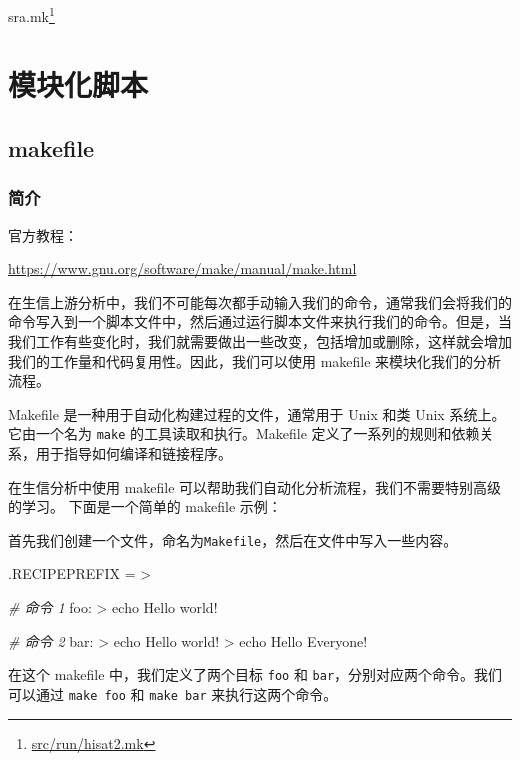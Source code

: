 \documentclass[]{ctexbook}
\newenvironment{Shaded}{\begin{snugshade}}{\end{snugshade}}
\newcommand{\CharTok}[1]{\textcolor[rgb]{0.31,0.60,0.02}{#1}}
\newcommand{\CommentTok}[1]{\textcolor[rgb]{0.56,0.35,0.01}{\textit{#1}}}
\newcommand{\DataTypeTok}[1]{\textcolor[rgb]{0.13,0.29,0.53}{#1}}
\newcommand{\DecValTok}[1]{\textcolor[rgb]{0.00,0.00,0.81}{#1}}
\newcommand{\NormalTok}[1]{#1}
\newcommand{\StringTok}[1]{\textcolor[rgb]{0.31,0.60,0.02}{#1}}
\renewcommand{\href}[2]{#2\footnote{\url{#1}}}
\begin{document}
\href{src/run/hisat2.mk}{sra.mk}

\part{模块化脚本}\label{part-ux6a21ux5757ux5316ux811aux672c}

\chapter{makefile}\label{makefile}

\section{简介}\label{ux7b80ux4ecb}

官方教程：

\url{https://www.gnu.org/software/make/manual/make.html}

在生信上游分析中，我们不可能每次都手动输入我们的命令，通常我们会将我们的命令写入到一个脚本文件中，然后通过运行脚本文件来执行我们的命令。但是，当我们工作有些变化时，我们就需要做出一些改变，包括增加或删除，这样就会增加我们的工作量和代码复用性。因此，我们可以使用 makefile 来模块化我们的分析流程。

Makefile 是一种用于自动化构建过程的文件，通常用于 Unix 和类 Unix 系统上。它由一个名为 \texttt{make} 的工具读取和执行。Makefile 定义了一系列的规则和依赖关系，用于指导如何编译和链接程序。

在生信分析中使用 makefile 可以帮助我们自动化分析流程，我们不需要特别高级的学习。
下面是一个简单的 makefile 示例：

首先我们创建一个文件，命名为\texttt{Makefile}，然后在文件中写入一些内容。

\begin{Shaded}
\begin{Highlighting}[]
\DataTypeTok{.RECIPEPREFIX} \CharTok{=}\StringTok{ \textgreater{}}

\CommentTok{\# 命令 1 }
\DecValTok{foo:}
\NormalTok{\textgreater{} echo Hello world!}

\CommentTok{\# 命令 2}
\DecValTok{bar:}
\NormalTok{\textgreater{} echo Hello world!}
\NormalTok{\textgreater{} echo Hello Everyone!}
\end{Highlighting}
\end{Shaded}

在这个 makefile 中，我们定义了两个目标 \texttt{foo} 和 \texttt{bar}，分别对应两个命令。我们可以通过 \texttt{make\ foo} 和 \texttt{make\ bar} 来执行这两个命令。
\end{document}
